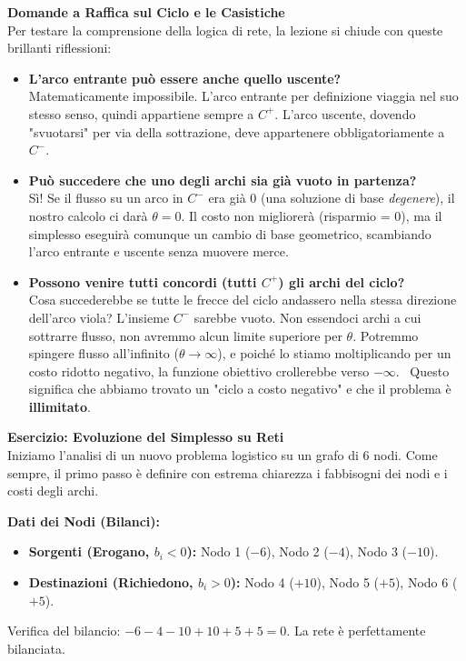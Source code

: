 \documentclass[12pt, a4paper]{article}
\begin{document}
	\vspace{0.4cm}
	\textbf{Domande a Raffica sul Ciclo e le Casistiche}\\
	Per testare la comprensione della logica di rete, la lezione si chiude con queste brillanti riflessioni:
	
	\begin{itemize}[label=\textcolor{titlecolor}{\Large\textbullet}, itemsep=4pt, leftmargin=1.5cm]
		\item \textbf{L'arco entrante può essere anche quello uscente?} \\
		Matematicamente impossibile. L'arco entrante per definizione viaggia nel suo stesso senso, quindi appartiene sempre a $C^+$. L'arco uscente, dovendo "svuotarsi" per via della sottrazione, deve appartenere obbligatoriamente a $C^-$.
		
		\item \textbf{Può succedere che uno degli archi sia già vuoto in partenza?} \\
		Sì! Se il flusso su un arco in $C^-$ era già $0$ (una soluzione di base \textit{degenere}), il nostro calcolo ci darà $\theta = 0$. Il costo non migliorerà (risparmio = 0), ma il simplesso eseguirà comunque un cambio di base geometrico, scambiando l'arco entrante e uscente senza muovere merce.
		
		\item \textbf{Possono venire tutti concordi (tutti $C^+$) gli archi del ciclo?} \\
		Cosa succederebbe se tutte le frecce del ciclo andassero nella stessa direzione dell'arco viola? L'insieme $C^-$ sarebbe vuoto. Non essendoci archi a cui sottrarre flusso, non avremmo alcun limite superiore per $\theta$. Potremmo spingere flusso all'infinito ($\theta \to \infty$), e poiché lo stiamo moltiplicando per un costo ridotto negativo, la funzione obiettivo crollerebbe verso $-\infty$. 
		Questo significa che abbiamo trovato un "ciclo a costo negativo" e che il problema è \textbf{illimitato}. 
	\end{itemize}
	
	\vspace{0.6cm}
	\textbf{Esercizio: Evoluzione del Simplesso su Reti}\\
	Iniziamo l'analisi di un nuovo problema logistico su un grafo di 6 nodi. Come sempre, il primo passo è definire con estrema chiarezza i fabbisogni dei nodi e i costi degli archi.
	
	\textbf{Dati dei Nodi (Bilanci):}
	\begin{itemize}[label=\textcolor{titlecolor}{\Large\textbullet}, itemsep=2pt, leftmargin=1.5cm]
		\item \textbf{Sorgenti (Erogano, $b_i < 0$):} Nodo 1 ($-6$), Nodo 2 ($-4$), Nodo 3 ($-10$).
		\item \textbf{Destinazioni (Richiedono, $b_i > 0$):} Nodo 4 ($+10$), Nodo 5 ($+5$), Nodo 6 ($+5$).
	\end{itemize}
	Verifica del bilancio: $-6 -4 -10 + 10 + 5 + 5 = 0$. La rete è perfettamente bilanciata.
	
\end{document}
